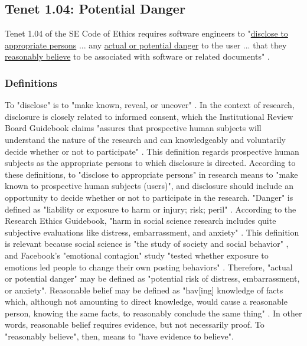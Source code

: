 \subsection{Tenet 1.04: Potential Danger}
Tenet 1.04 of the SE Code of Ethics requires software engineers to "\uline{disclose to appropriate persons} ... any \uline{actual or potential danger} to the user ... that they \uline{reasonably believe} to be associated with software or related documents" \cite{code}.

\subsubsection{Definitions}
To "disclose" is to "make known, reveal, or uncover" \cite{define-disclose}.  In the context of research, disclosure is closely related to informed consent, which the Institutional Review Board Guidebook claims "assures that prospective human subjects will understand the nature of the research and can knowledgeably and voluntarily decide whether or not to participate" \cite{irb-informed-consent}.  This definition regards prospective human subjects as the appropriate persons to which disclosure is directed.  According to these definitions, to "disclose to appropriate persons" in research means to "make known to prospective human subjects (users)", and disclosure should include an opportunity to decide whether or not to participate in the research.
"Danger" is defined as "liability or exposure to harm or injury; risk; peril" \cite{define-danger}.  According to the Research Ethics Guidebook, "harm in social science research includes quite subjective evaluations like distress, embarrassment, and anxiety" \cite{define-harm}.  This definition is relevant because social science is "the study of society and social behavior" \cite{define-social-science}, and Facebook's "emotional contagion" study "tested whether exposure to emotions led people to change their own posting behaviors" \cite{study}.  Therefore, "actual or potential danger" may be defined as "potential risk of distress, embarrassment, or anxiety".
Reasonable belief may be defined as "hav[ing] knowledge of facts which, although not amounting to direct knowledge, would cause a reasonable person, knowing the same facts, to reasonably conclude the same thing" \cite{define-reasonable-belief}.  In other words, reasonable belief requires evidence, but not necessarily proof.  To "reasonably believe", then, means to "have evidence to believe".


